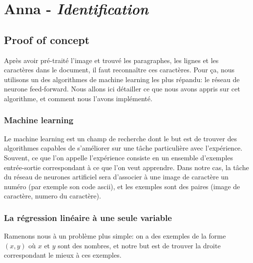 \chapter{Anna - \emph{Identification}}

\section{Proof of concept}
Après avoir pré-traité l'image et trouvé les paragraphes, les lignes et les caractères dans le document, il faut reconnaître ces caractères. Pour ça, nous utilisons un des algorithmes de machine learning les plus répandu: le réseau de neurone feed-forward. Nous allons ici détailler ce que nous avons appris sur cet algorithme, et comment nous l'avons implémenté.

\subsection{Machine learning}

Le machine learning est un champ de recherche dont le but est de trouver des algorithmes capables de s'améliorer sur une tâche particulière avec l'expérience. Souvent, ce que l'on appelle l'expérience consiste en un ensemble d'exemples entrée-sortie correspondant à ce que l'on veut apprendre. Dans notre cas, la tâche du réseau de neurones artificiel sera d'associer à une image de caractère un numéro (par exemple son code ascii), et les exemples sont des paires (image de caractère, numero du caractère).

\subsection{La régression linéaire à une seule variable}

Ramenons nous à un problème plus simple: on a des exemples de la forme $(x, y)$ où $x$ et $y$ sont des nombres, et notre but est de trouver la droite correspondant le mieux à ces exemples.\\


